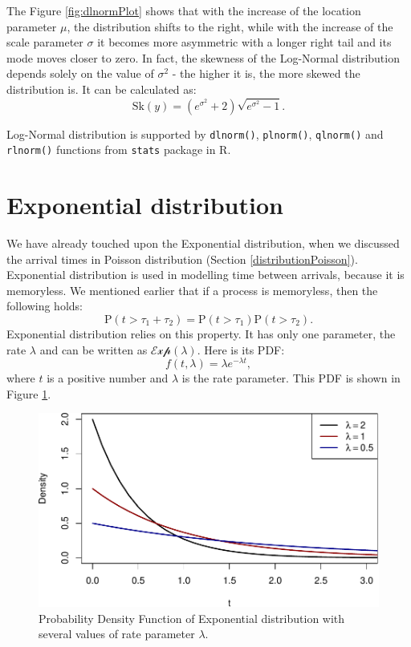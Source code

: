 \documentclass[
]{book}
\theoremstyle{definition}
\theoremstyle{definition}
\theoremstyle{definition}
\theoremstyle{definition}
\theoremstyle{remark}
\begin{document}
The Figure \ref{fig:dlnormPlot} shows that with the increase of the location parameter \(\mu\), the distribution shifts to the right, while with the increase of the scale parameter \(\sigma\) it becomes more asymmetric with a longer right tail and its mode moves closer to zero. In fact, the skewness of the Log-Normal distribution depends solely on the value of \(\sigma^2\) - the higher it is, the more skewed the distribution is. It can be calculated as:
\begin{equation}
    \mathrm{Sk}(y) = \left(e^{\sigma^2} + 2\right) \sqrt{e^{\sigma^2}-1} .
    \label{eq:LogNormalSkewness}
\end{equation}

Log-Normal distribution is supported by \texttt{dlnorm()}, \texttt{plnorm()}, \texttt{qlnorm()} and \texttt{rlnorm()} functions from \texttt{stats} package in R.

\hypertarget{distributionsExponential}{%
\section{Exponential distribution}\label{distributionsExponential}}

We have already touched upon the Exponential distribution, when we discussed the arrival times in Poisson distribution (Section \ref{distributionPoisson}). Exponential distribution is used in modelling time between arrivals, because it is memoryless. We mentioned earlier that if a process is memoryless, then the following holds:
\begin{equation*}
    \mathrm{P}(t > \tau_1 + \tau_2) = \mathrm{P}(t > \tau_1)\mathrm{P}(t > \tau_2) .
\end{equation*}
Exponential distribution relies on this property. It has only one parameter, the rate \(\lambda\) and can be written as \(\mathcal{Exp}(\lambda)\). Here is its PDF:
\begin{equation}
    f(t, \lambda) = \lambda e^{-\lambda t} ,
    \label{eq:ExponentialPMF}
\end{equation}
where \(t\) is a positive number and \(\lambda\) is the rate parameter. This PDF is shown in Figure \ref{fig:dexpPlot}.

\begin{figure}
\centering
\includegraphics{Svetunkov---Statistics-for-Business-Analytics_files/figure-latex/dexpPlot-1.pdf}
\caption{\label{fig:dexpPlot}Probability Density Function of Exponential distribution with several values of rate parameter \(\lambda\).}
\end{figure}
\end{document}
